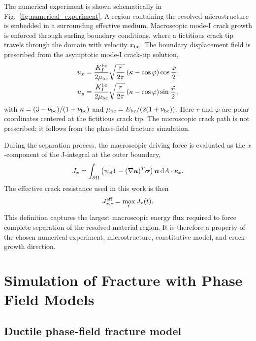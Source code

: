 \documentclass[pdflatex,sn-mathphys-num]{sn-jnl}
\newcommand{\Jeff}{J_{x,c}^{\rm eff}}
\begin{document}
The numerical experiment is shown schematically in Fig.~\ref{fig:numerical_experiment}. A region containing the resolved microstructure is embedded in a surrounding effective medium. Macroscopic mode-I crack growth is enforced through surfing boundary conditions, where a fictitious crack tip travels through the domain with velocity \(\dot{x}_{\rm bc}\). The boundary displacement field is prescribed from the asymptotic mode-I crack-tip solution,
\begin{align}
    u_x &= \frac{K_I^{\rm bc}}{2\mu_{\rm bc}} \sqrt{\frac{r}{2\pi}}\left(\kappa-\cos\varphi\right)\cos\frac{\varphi}{2},\\
    u_y &= \frac{K_I^{\rm bc}}{2\mu_{\rm bc}} \sqrt{\frac{r}{2\pi}}\left(\kappa-\cos\varphi\right)\sin\frac{\varphi}{2},
    \label{eq:surfing-bcs}
\end{align}
with \(\kappa=(3-\nu_{\rm bc})/(1+\nu_{\rm bc})\) and \(\mu_{\rm bc}=E_{\rm bc}/(2(1+\nu_{\rm bc}))\). Here \(r\) and \(\varphi\) are polar coordinates centered at the fictitious crack tip. The microscopic crack path is not prescribed; it follows from the phase-field fracture simulation.

During the separation process, the macroscopic driving force is evaluated as the \(x\)-component of the J-integral at the outer boundary,
\begin{equation}
    J_x = \int_{\partial\Omega}\left(\psi_{\rm el}\boldsymbol{1} - (\nabla\boldsymbol{u})^T\boldsymbol{\sigma}\right)\boldsymbol{n}\,{\rm d}A \cdot \boldsymbol{e}_x .
    \label{eq:J-integral}
\end{equation}
The effective crack resistance used in this work is then
\begin{equation}
    \Jeff = \max_t J_x(t).
    \label{eq:effective_resistance}
\end{equation}
This definition captures the largest macroscopic energy flux required to force complete separation of the resolved material region. It is therefore a property of the chosen numerical experiment, microstructure, constitutive model, and crack-growth direction.

\section{Simulation of Fracture with Phase Field Models}\label{sec:simulation_phase_field_models}

\subsection{Ductile phase-field fracture model}\label{sec:phase_fiel_model_ductile}
\end{document}
